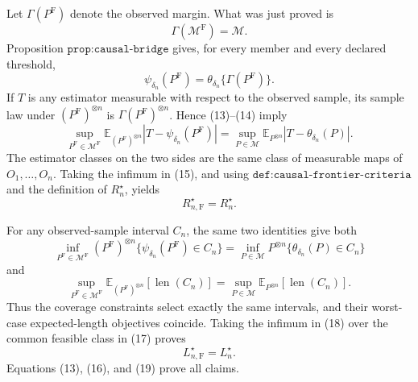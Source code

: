 Let \(\Gamma(P^{\mathrm F})\) denote the observed margin.  What was just proved is
\[
 \Gamma(\mathcal M^{\mathrm F})=\mathcal M.
 \tag{13}
\]
Proposition \(\texttt{prop:causal-bridge}\) gives, for every member and every declared threshold,
\[
 \psi_{\delta_n}(P^{\mathrm F})
 =\theta_{\delta_n}\{\Gamma(P^{\mathrm F})\}.
 \tag{14}
\]
If \(T\) is any estimator measurable with respect to the observed sample, its sample law under \((P^{\mathrm F})^{\otimes n}\) is \(\Gamma(P^{\mathrm F})^{\otimes n}\).  Hence (13)--(14) imply
\[
 \sup_{P^{\mathrm F}\in\mathcal M^{\mathrm F}}
 \mathbb E_{(P^{\mathrm F})^{\otimes n}}
 |T-\psi_{\delta_n}(P^{\mathrm F})|
 =
 \sup_{P\in\mathcal M}
 \mathbb E_{P^{\otimes n}}|T-\theta_{\delta_n}(P)|.
 \tag{15}
\]
The estimator classes on the two sides are the same class of measurable maps of \(O_1,\ldots,O_n\).  Taking the infimum in (15), and using \(\texttt{def:causal-frontier-criteria}\) and the definition of \(R_n^\star\), yields
\[
 R_{n,\mathrm F}^\star=R_n^\star.
 \tag{16}
\]

For any observed-sample interval \(C_n\), the same two identities give both
\[
 \inf_{P^{\mathrm F}\in\mathcal M^{\mathrm F}}
 (P^{\mathrm F})^{\otimes n}
 \{\psi_{\delta_n}(P^{\mathrm F})\in C_n\}
 =
 \inf_{P\in\mathcal M}P^{\otimes n}
 \{\theta_{\delta_n}(P)\in C_n\}
 \tag{17}
\]
and
\[
 \sup_{P^{\mathrm F}\in\mathcal M^{\mathrm F}}
 \mathbb E_{(P^{\mathrm F})^{\otimes n}}[\operatorname{len}(C_n)]
 =
 \sup_{P\in\mathcal M}
 \mathbb E_{P^{\otimes n}}[\operatorname{len}(C_n)].
 \tag{18}
\]
Thus the coverage constraints select exactly the same intervals, and their worst-case expected-length objectives coincide.  Taking the infimum in (18) over the common feasible class in (17) proves
\[
 L_{n,\mathrm F}^\star=L_n^\star.
 \tag{19}
\]
Equations (13), (16), and (19) prove all claims.